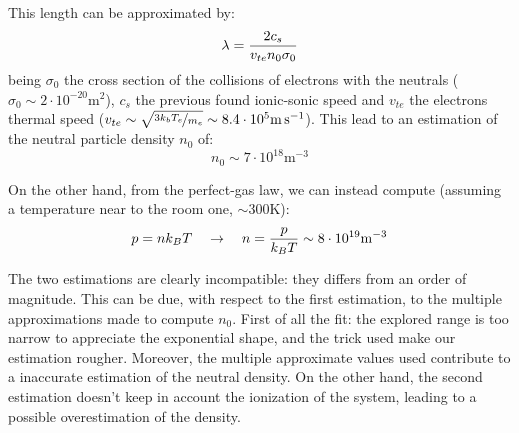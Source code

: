 \documentclass[11pt,a4 paper]{article}
\let\oldfrac\frac
\renewcommand{\frac}[3][d]{\ifthenelse{\equal{#1}{d}}{\oldfrac{#2}{#3}}{\nicefrac{#2}{#3}}}
\begin{document}
This length can be approximated by:
\begin{equation*}
  \lambda = \frac{2c_s}{v_{te}n_0\sigma_0}
\end{equation*}
being $\sigma_0$ the cross section of the collisions of electrons with the neutrals ($\sigma_0\sim2\cdot10^{-20}\si{\metre\squared}$), $c_s$ the previous found ionic-sonic speed and $v_{te}$ the electrons thermal speed ($v_{te}\sim\sqrt{\frac[f]{3k_bT_e}{m_e}}\sim8.4\cdot10^{5}\si{\metre\per\second}$). This lead to an estimation of the neutral particle density $n_0$ of:
\begin{equation*}
  n_0 \sim 7\cdot10^{18} \si{\metre^{-3}}
\end{equation*}

On the other hand, from the perfect-gas law, we can instead compute (assuming a temperature near to the room one, $\sim300\si{\kelvin}$):
\begin{equation*}
  p = nk_BT\quad\rightarrow\quad n = \frac{p}{k_BT} \sim 8\cdot10^{19} \si{\metre^{-3}}
\end{equation*}

The two estimations are clearly incompatible: they differs from an order of magnitude. This can be due, with respect to the first estimation, to the multiple approximations made to compute $n_0$. First of all the fit: the explored range is too narrow to appreciate the exponential shape, and the trick used make our estimation rougher. Moreover, the multiple approximate values used contribute to a inaccurate estimation of the neutral density. On the other hand, the second estimation doesn't keep in account the ionization of the system, leading to a possible overestimation of the density.
\end{document}
